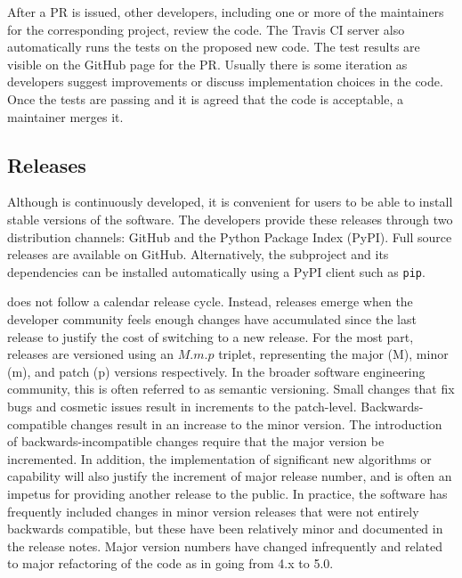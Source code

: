 After a PR is issued, other developers, including one or more of the
maintainers for the corresponding project, review the code.  The Travis
CI server also automatically runs the tests on the proposed new code.  The test
results are visible on the GitHub page for the PR.  Usually there is
some iteration as developers suggest improvements or discuss
implementation choices in the code.  Once the tests are passing and it
is agreed that the code is acceptable, a maintainer merges it.

\subsection{Releases}

Although \clawpack is continuously developed, it is convenient for
users to be able to install stable versions of the software.  The
\clawpack developers provide these releases through two distribution
channels: GitHub and the Python Package Index (PyPI).  Full source
releases are available on GitHub.  Alternatively, the \pyclaw
subproject and its dependencies can be installed automatically using a
PyPI client such as \texttt{pip}.

\clawpack does not follow a calendar release cycle.  Instead, releases
emerge when the developer community feels enough changes have
accumulated since the last release to justify
the cost of switching to a new release.  For the most part, \clawpack
releases are
versioned using an $M.m.p$ triplet, representing the major (M), minor (m), and
patch (p) versions respectively.  In the broader software engineering
community, this is often referred to as semantic versioning.  Small
changes that fix bugs and cosmetic issues result in increments to the
patch-level.  Backwards-compatible changes result in an increase to
the minor version.  The introduction of backwards-incompatible changes
require that the major version be incremented.  In addition, the
implementation of significant new algorithms or capability will also
justify the increment of major release number, and is often an impetus
for providing another release to the public.
In practice, the \clawpack software has frequently included changes in minor
version releases that were not entirely backwards compatible, but these have
been relatively minor and documented in the release notes.  Major version
numbers have changed infrequently and related to major refactoring of the
code as in going from 4.x to 5.0.
